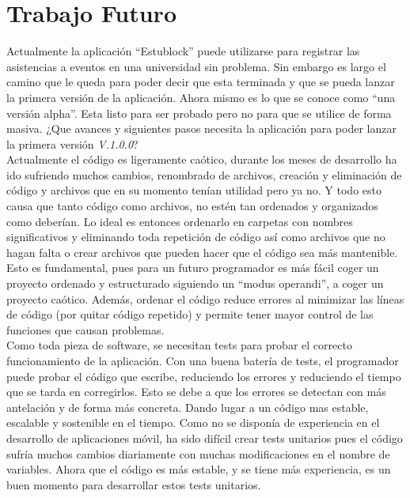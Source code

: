 \chapter{Trabajo Futuro}
\label{cap:Futuro}

Actualmente la aplicación ``Estublock'' puede utilizarse para registrar las asistencias a eventos en una universidad sin problema. Sin embargo es largo el camino que le queda para poder decir que esta terminada y que se pueda lanzar la primera versión de la aplicación. Ahora mismo es lo que se conoce como ``una versión alpha''. Esta listo para ser probado pero no para que se utilice de forma masiva. ¿Que avances y siguientes pasos necesita la aplicación para poder lanzar la primera versión \emph{V.1.0.0}? \\

Actualmente el código es ligeramente caótico, durante los meses de desarrollo ha ido sufriendo muchos cambios, renombrado de archivos, creación y eliminación de código y archivos que en su momento tenían utilidad pero ya no. Y todo esto causa que tanto código como archivos, no estén tan ordenados y organizados como deberían. Lo ideal es entonces ordenarlo en carpetas con nombres significativos y eliminando toda repetición de código así como archivos que no hagan falta o crear archivos que pueden hacer que el código sea más mantenible. Esto es fundamental, pues para un futuro programador es más fácil coger un proyecto ordenado y estructurado siguiendo un ``modus operandi'', a coger un proyecto caótico. Además, ordenar el código reduce errores al minimizar las líneas de código (por quitar código repetido) y permite tener mayor control de las funciones que causan problemas. \\
 
Como toda pieza de software, se necesitan tests para probar el correcto funcionamiento de la aplicación. Con una buena batería de tests, el programador puede probar el código que escribe, reduciendo los errores y reduciendo el tiempo que se tarda en corregirlos. Esto se debe a que los errores se detectan con más antelación y de forma más concreta. Dando lugar a un código mas estable, escalable y sostenible en el tiempo. Como no se disponía de experiencia en el desarrollo de aplicaciones móvil, ha sido difícil crear tests unitarios pues el código sufría muchos cambios diariamente con muchas modificaciones en el nombre de variables. Ahora que el código es más estable, y se tiene más experiencia, es un buen momento para desarrollar estos tests unitarios. \\

